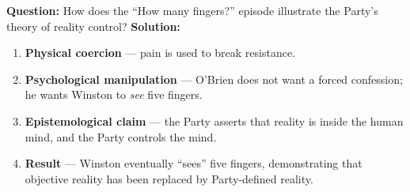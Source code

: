 \documentclass[11pt]{article}
\begin{document}
\begin{exoresolu}
\textbf{Question:} How does the “How many fingers?” episode illustrate the Party’s theory of reality control?
\textbf{Solution:}
\begin{enumerate}
\item \textbf{Physical coercion} — pain is used to break resistance.
\item \textbf{Psychological manipulation} — O’Brien does not want a forced confession; he wants Winston to \emph{see} five fingers.
\item \textbf{Epistemological claim} — the Party asserts that reality is inside the human mind, and the Party controls the mind.
\item \textbf{Result} — Winston eventually “sees” five fingers, demonstrating that objective reality has been replaced by Party‑defined reality.
\end{enumerate}
\end{exoresolu}
\end{document}
